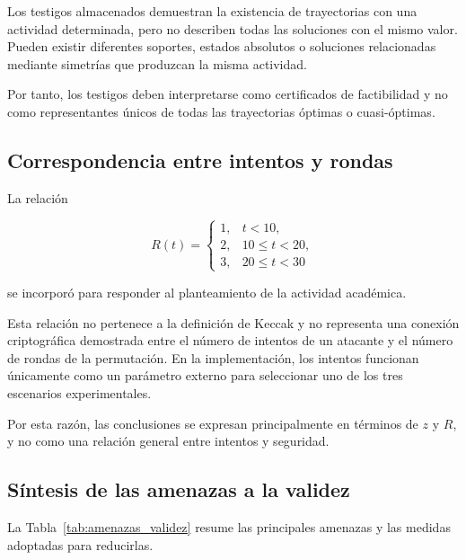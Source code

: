 Los testigos almacenados demuestran la existencia de trayectorias con una
actividad determinada, pero no describen todas las soluciones con el mismo
valor. Pueden existir diferentes soportes, estados absolutos o soluciones
relacionadas mediante simetrías que produzcan la misma actividad.

Por tanto, los testigos deben interpretarse como certificados de
factibilidad y no como representantes únicos de todas las trayectorias
óptimas o cuasi-óptimas.


\subsection{Correspondencia entre intentos y rondas}
\label{subsec:limitacion_intentos_rondas}

La relación

\[
R(t)=
\begin{cases}
1, & t<10,\\
2, & 10\leq t<20,\\
3, & 20\leq t<30
\end{cases}
\]

se incorporó para responder al planteamiento de la actividad académica.

Esta relación no pertenece a la definición de Keccak y no representa una
conexión criptográfica demostrada entre el número de intentos de un
atacante y el número de rondas de la permutación. En la implementación,
los intentos funcionan únicamente como un parámetro externo para seleccionar
uno de los tres escenarios experimentales.

Por esta razón, las conclusiones se expresan principalmente en términos de
$z$ y $R$, y no como una relación general entre intentos y seguridad.


\subsection{Síntesis de las amenazas a la validez}
\label{subsec:sintesis_amenazas}

La Tabla~\ref{tab:amenazas_validez} resume las principales amenazas y las
medidas adoptadas para reducirlas.

